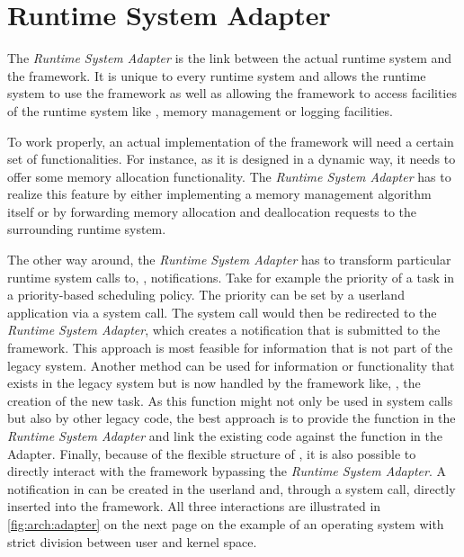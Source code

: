 \section{Runtime System Adapter}%
\label{sec:arch:adapter}

The \emph{Runtime System Adapter} is the link between the actual runtime system and the \cobas{} framework. It is unique to every runtime system and allows the runtime system to use the framework as well as allowing the framework to access facilities of the runtime system like \eg{}, memory management or logging facilities.

To work properly, an actual implementation of the \cobas{} framework will need a certain set of functionalities. For instance, as it is designed in a dynamic way, it needs to offer some memory allocation functionality. The \emph{Runtime System Adapter} has to realize this feature by either implementing a memory management algorithm itself or by forwarding memory allocation and deallocation requests to the surrounding runtime system.

The other way around, the \emph{Runtime System Adapter} has to transform particular runtime system calls to, \eg{}, \cobas{} notifications. Take for example the priority of a task in a priority-based scheduling policy. The priority can be set by a userland application via a system call. The system call would then be redirected to the \emph{Runtime System Adapter}, which creates a notification that is submitted to the \cobas{} framework. This approach is most feasible for information that is not part of the legacy system. Another method can be used for information or functionality that exists in the legacy system but is now handled by the \cobas{} framework like, \eg{}, the creation of the new task. As this function might not only be used in system calls but also by other legacy code, the best approach is to provide the function in the \emph{Runtime System Adapter} and link the existing code against the function in the Adapter. Finally, because of the flexible structure of \cobas{}, it is also possible to directly interact with the framework bypassing the \emph{Runtime System Adapter}. A notification in \cobas{} can be created in the userland and, through a system call, directly inserted into the framework. All three interactions are illustrated in \cref{fig:arch:adapter} on the next page on the example of an operating system with strict division between user and kernel space.

\begin{sidewaysfigure} \centering
	\caption[Example of a CoBaS Runtime System Adapter.]{Example of a CoBaS Runtime System Adapter in an operating system with user and kernel space separation. Three different interactions are depicted: The interaction of legacy kernel code with the framework, the indirect interaction of the user space with the framework through modified system calls, and the direct interaction of the user space with the framework through a notification system call.}%
	\label{fig:arch:adapter}
\end{sidewaysfigure}

